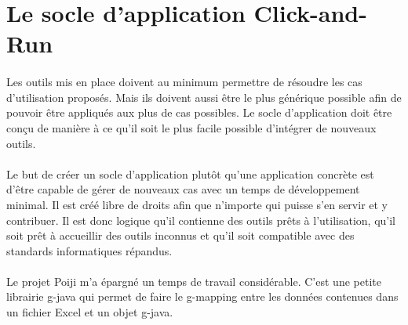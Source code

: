 \section{Le socle d'application Click-and-Run}
\label{sec:spreadsheet-framework}

\paragraph{}
Les outils mis en place doivent au minimum permettre de résoudre les cas d'utilisation proposés.
Mais ils doivent aussi être le plus générique possible afin de pouvoir être appliqués aux plus de cas possibles.
Le socle d'application doit être conçu de manière à ce qu'il soit le plus facile possible d'intégrer de nouveaux outils.

\paragraph{}
Le but de créer un socle d'application plutôt qu'une application concrète est d'être capable de gérer de nouveaux cas avec un temps de développement minimal.
Il est créé libre de droits afin que n'importe qui puisse s'en servir et y contribuer.
Il est donc logique qu'il contienne des outils prêts à l'utilisation, qu'il soit prêt à accueillir des outils inconnus et qu'il soit compatible avec des standards informatiques répandus.

\paragraph{}
Le projet Poiji m'a épargné un temps de travail considérable.
C'est une petite librairie \Gls{g-java} qui permet de faire le \gls{g-mapping} entre les données contenues dans un fichier Excel et un objet \Gls{g-java}\cite{ozler_:candy:_2019}.






